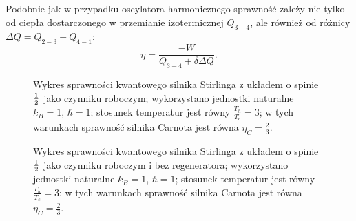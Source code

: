 Podobnie jak w przypadku oscylatora harmonicznego sprawność zależy nie tylko od ciepła dostarczonego w przemianie izotermicznej \(Q_{3-4}\), ale również od różnicy \(\Delta Q = Q_{2-3} + Q_{4-1}\):
\begin{equation}
	\eta = \frac{- W}{Q_{3-4} + \delta\Delta Q}.
\end{equation}

\begin{figure}[h]
	\begin{subfigure}{0.45\textwidth}
		\centering
		
	\end{subfigure}
	\begin{subfigure}{0.45\textwidth}
		\centering
		
	\end{subfigure}
	\caption{Wykres sprawności kwantowego silnika Stirlinga z układem o spinie \(\frac{1}{2}\) jako czynniku roboczym; wykorzystano jednostki naturalne \(k_B = 1\), \(\hbar = 1\); stosunek temperatur jest równy \(\frac{T_h}{T_c} = 3\); w tych warunkach sprawność silnika Carnota jest równa \(\eta_C = \frac{2}{3}\).}
	\label{fig:wykres_kw_stirling_spin_pol}
\end{figure}

\begin{figure}[h]
	\begin{subfigure}{0.45\textwidth}
		\centering
		
	\end{subfigure}
	\begin{subfigure}{0.45\textwidth}
		\centering
		
	\end{subfigure}
	\caption{Wykres sprawności kwantowego silnika Stirlinga z układem o spinie \(\frac{1}{2}\) jako czynniku roboczym i bez regeneratora; wykorzystano jednostki naturalne \(k_B = 1\), \(\hbar = 1\); stosunek temperatur jest równy \(\frac{T_h}{T_c} = 3\); w tych warunkach sprawność silnika Carnota jest równa \(\eta_C = \frac{2}{3}\).}
	\label{fig:wykres_kw_stirling_spin_pol_bezreg}
\end{figure}

